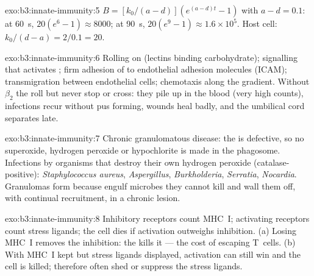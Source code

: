 \begin{solution}{exo:b3:innate-immunity:5}
$B = [k_{0}/(a-d)](e^{(a-d)t} - 1)$ with $a - d = 0.1$: at \qty{60}{s},
$20(e^{6} - 1) \approx 8000$; at \qty{90}{s}, $20(e^{9} - 1) \approx
1.6\times 10^{5}$. Host cell: $k_{0}/(d - a) = 2/0.1 = 20$.
\end{solution}

\begin{solution}{exo:b3:innate-immunity:6}
Rolling on  (lectins binding carbohydrate); 
signalling that activates ; firm adhesion of  to
endothelial adhesion molecules (ICAM); transmigration between
endothelial cells; chemotaxis along the gradient. Without
$\beta_{2}$  the  roll but never stop or cross:
they pile up in the blood (very high counts), infections recur without
pus forming, wounds heal badly, and the umbilical cord separates late.
\end{solution}

\begin{solution}{exo:b3:innate-immunity:7}
Chronic granulomatous disease: the  is defective, so no
superoxide, hydrogen peroxide or hypochlorite is made in the phagosome.
Infections by organisms that destroy their own hydrogen peroxide
(catalase-positive): \emph{Staphylococcus aureus}, \emph{Aspergillus},
\emph{Burkholderia}, \emph{Serratia}, \emph{Nocardia}. Granulomas form
because  engulf microbes they cannot kill and wall them
off, with continual recruitment, in a chronic lesion.
\end{solution}

\begin{solution}{exo:b3:innate-immunity:8}
Inhibitory receptors count MHC~I; activating receptors count stress
ligands; the cell dies if activation outweighs inhibition. (a) Losing
MHC~I removes the inhibition: the  kills it --- the
cost of escaping T~cells. (b) With MHC~I kept but stress ligands
displayed, activation can still win and the cell is killed; 
therefore often shed or suppress the stress ligands.
\end{solution}

